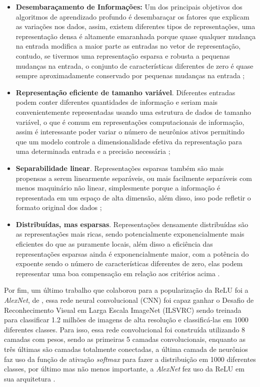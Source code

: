 \begin{itemize}
    \item \textbf{Desembaraçamento de Informações:} Um dos principais objetivos dos algoritmos de aprendizado profundo é desembaraçar os fatores que explicam as variações nos dados, assim, existem diferentes tipos de representações, uma representação densa é altamente emaranhada porque quase qualquer mudança na entrada modifica a maior parte as entradas no vetor de representação, contudo, se tivermos uma representação esparsa e robusta a pequenas mudanças na entrada, o conjunto de características diferentes de zero é quase sempre aproximadamente conservado por pequenas mudanças na entrada \parencite{Glorot};
    \item \textbf{Representação eficiente de tamanho variável}. Diferentes entradas podem conter diferentes quantidades de informação e seriam mais convenientemente representadas usando uma estrutura de dados de tamanho variável, o que é comum em representações computacionais de informação, assim é interessante poder variar o número de neurônios ativos permitindo que um modelo controle a dimensionalidade efetiva da representação para uma determinada entrada e a precisão necessária \parencite{Glorot};
    \item \textbf{Separabilidade linear}. Representações esparsas também são mais propensas a serem linearmente separáveis, ou mais facilmente separáveis com menos maquinário não linear, simplesmente porque a informação é representada em um espaço de alta dimensão, além disso, isso pode refletir o formato original dos dados \parencite{Glorot};
    \item \textbf{Distribuídas, mas esparsas}. Representações densamente distribuídas são as representações mais ricas, sendo potencialmente exponencialmente mais eficientes do que as puramente locais, além disso a eficiência das representações esparsas ainda é exponencialmente maior, com a potência do expoente sendo o número de características diferentes de zero, elas podem representar uma boa compensação em relação aos critérios acima \parencite{Glorot}.
\end{itemize}

Por fim, um último trabalho que colaborou para a popularização da ReLU foi a \textit{AlexNet}, de \textcite{AlexNet}, essa rede neural convolucional (CNN) foi capaz ganhar o Desafio de Reconhecimento Visual em Larga Escala ImageNet (ILSVRC) sendo treinada para classificar 1.2 milhões de imagens de alta resolução e classificá-las em 1000 diferentes classes. Para isso, essa rede convolucional foi construída utilizando 8 camadas com pesos, sendo as primeiras 5 camadas convolucionais, enquanto as três últimas são camadas totalmente conectadas, a última camada de neurônios faz uso da função de ativação \textit{softmax} para fazer a distribuição em 1000 diferentes classes, por último mas não menos importante, a \textit{AlexNet} fez uso da ReLU em sua arquitetura \parencite{AlexNet}.


